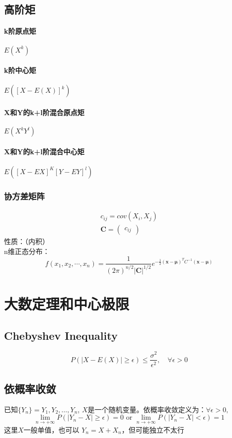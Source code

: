 \documentclass[a4paper]{ctexart}
\begin{document}
\subsection{高阶矩}
\paragraph{k阶原点矩} $E(X^k)$
\paragraph{k阶中心矩} $E([X-E(X)]^k)$
\paragraph{X和Y的k+l阶混合原点矩} $E(X^kY^l)$
\paragraph{X和Y的k+l阶混合中心矩} $E([X-EX]^K[Y-EY]^l)$
\subsubsection{协方差矩阵}
\begin{gather}
    c_{ij}=cov(X_i,X_j)\\
    \bm C=\begin{pmatrix}
        c_{ij}
    \end{pmatrix}
\end{gather}
性质：（内积）\\
n维正态分布：
\begin{equation}
    f(x_1,x_2,\cdots,x_n)=\frac{1}{(2\pi)^{n/2}\vert\bm C\vert^{1/2}} e^{-\frac{1}{2}(\bm x-\bm \mu)^T C^{-1} (\bm x-\bm \mu)}
\end{equation}

\clearpage
\section{大数定理和中心极限}
\subsection{Chebyshev Inequality}
\begin{equation*}
    P(\vert X-E(X) \vert\geq \epsilon)\leq \frac{\sigma^2}{\epsilon^2}, \quad \forall \epsilon>0
\end{equation*}
\subsection{依概率收敛}
已知$\{Y_n\}=Y_1,Y_2,\ldots,Y_n$, $X$是一个随机变量。依概率收敛定义为：$\forall \epsilon>0,$
\begin{equation*}
    \lim_{n\rightarrow +\infty} P(\vert Y_n-X\vert\geq \epsilon)=0 \text{ or } \lim_{n\rightarrow +\infty} P(\vert Y_n -X\vert< \epsilon)=1
\end{equation*}
这里$X$一般单值，也可以 $Y_n = X + X_n$，但可能独立不太行
\end{document}
